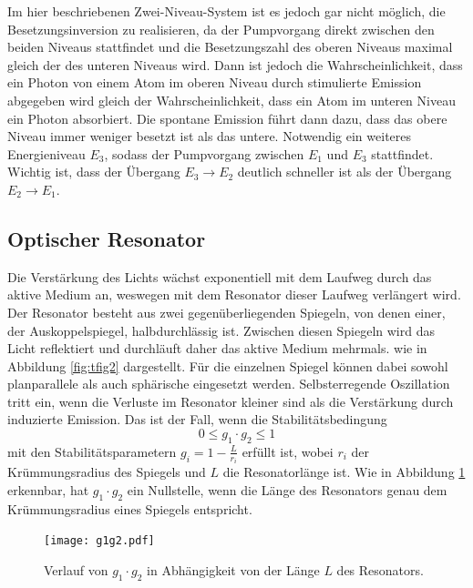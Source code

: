 Im hier beschriebenen Zwei-Niveau-System ist es jedoch gar nicht möglich, die Besetzungsinversion zu realisieren,
da der Pumpvorgang direkt zwischen den beiden Niveaus stattfindet und die Besetzungszahl des oberen Niveaus maximal
gleich der des unteren Niveaus wird. Dann ist jedoch die Wahrscheinlichkeit, dass ein Photon von einem Atom im oberen 
Niveau durch stimulierte Emission abgegeben wird gleich der Wahrscheinlichkeit, dass ein Atom im unteren Niveau ein 
Photon absorbiert. Die spontane Emission führt dann dazu, dass das obere Niveau immer weniger besetzt ist als das untere.
Notwendig ein weiteres Energieniveau $E_3$, sodass der Pumpvorgang zwischen $E_1$ und $E_3$ stattfindet. Wichtig ist,
dass der Übergang $E_3 \rightarrow E_2$ deutlich schneller ist als der Übergang $E_2 \rightarrow E_1$.

\subsection*{Optischer Resonator}
Die Verstärkung des Lichts wächst exponentiell mit dem Laufweg durch das aktive Medium an, weswegen mit dem 
Resonator dieser Laufweg verlängert wird. Der Resonator besteht aus zwei gegenüberliegenden Spiegeln, von denen einer, der Auskoppelspiegel, 
halbdurchlässig ist. Zwischen diesen Spiegeln wird das Licht reflektiert und durchläuft daher das aktive Medium mehrmals.
wie in Abbildung \ref{fig:tfig2} dargestellt.
Für die einzelnen Spiegel können dabei sowohl planparallele als auch sphärische eingesetzt werden. 
Selbsterregende Oszillation tritt ein, wenn die Verluste im Resonator kleiner sind als die Verstärkung durch 
induzierte Emission. Das ist der Fall, wenn die Stabilitätsbedingung
\begin{equation}
    \label{eq:stabil}
    0 \leq g_1 \cdot g_2 \leq 1 
\end{equation}
mit den Stabilitätsparametern $g_i = 1 - \frac{L}{r_i}$ erfüllt ist, wobei $r_i$ der Krümmungsradius des Spiegels
und $L$ die Resonatorlänge ist.
Wie in Abbildung \ref{fig:tfig3} erkennbar, hat $g_1 \cdot g_2$ ein Nullstelle, wenn die Länge des Resonators
genau dem Krümmungsradius eines Spiegels entspricht.
\FloatBarrier
    \begin{figure}[h]
    \centering
    \texttt{[image: g1g2.pdf]}
    \caption{Verlauf von $g_1 \cdot g_2$ in Abhängigkeit von der Länge $L$ des Resonators.}
    \label{fig:tfig3}
    \end{figure}
\FloatBarrier
\noindent

